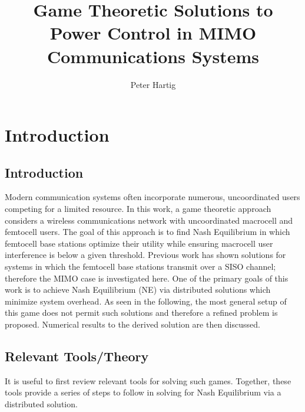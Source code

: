 \documentclass[12pt,a4paper]{report}
\title{Game Theoretic Solutions to Power Control in MIMO Communications Systems}
\author{Peter Hartig}
\begin{document}
\maketitle

%
\tableofcontents
\newpage

\chapter{Introduction}
\section{Introduction}
Modern communication systems often incorporate numerous, uncoordinated users competing for a limited resource.
In this work, a game theoretic approach considers a wireless communications network with uncoordinated  macrocell and femtocell users. The goal of this approach is to find Nash Equilibrium in which femtocell base stations optimize their utility while ensuring macrocell user interference is below a given threshold. 
Previous work has shown solutions for systems in which the femtocell base stations transmit over a SISO channel; therefore the MIMO case is investigated here. 
One of the primary goals of this work is to achieve Nash Equilibrium (NE) via distributed solutions which minimize system overhead. As seen in the following, the most general setup of this game does not permit such solutions and therefore a refined problem is proposed. Numerical results to the derived solution are then discussed. 


\section{Relevant Tools/Theory}

It is useful to first review relevant tools for solving such games. Together, these tools provide a series of steps to follow in solving for Nash Equilibrium via a distributed solution. 
\end{document}
